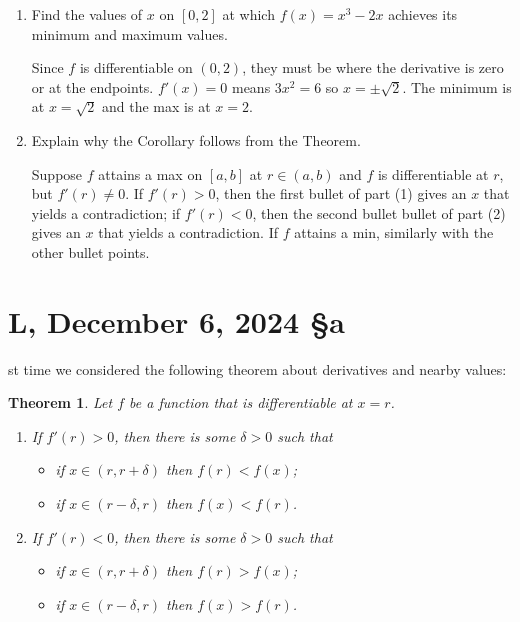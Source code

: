 \documentclass[12pt]{amsart}
\numberwithin{equation}{section}
\theoremstyle{plain} %
\newtheorem{thm}[equation]{Theorem}
\newcommand{\Dec}[3]{\section{#2, December #1, 2024 \quad \S#3}}
\theoremstyle{definition}
\theoremstyle{remark}
\begin{document}
 \begin{enumerate}
 
 \item Find the values of $x$ on $[0,2]$ at which $f(x) = x^3-2x$ achieves its minimum and maximum values.
 
\begin{framed}
Since $f$ is differentiable on $(0,2)$, they must be where the derivative is zero or at the endpoints. $f'(x)=0$ means $3x^2=6$ so $x=\pm \sqrt{2}$. The minimum is at $x=\sqrt{2}$ and the max is at $x=2$.
\end{framed}

 
 \item Explain why the Corollary follows from the Theorem.
 
 \begin{framed}
Suppose $f$ attains a max on $[a,b]$ at $r\in(a,b)$ and $f$ is differentiable at $r$, but $f'(r)\neq 0$. If $f'(r)>0$, then the first bullet of part (1) gives an $x$ that yields a contradiction; if $f'(r)<0$, then the second bullet bullet of part (2) gives an $x$ that yields a contradiction. If $f$ attains a min, similarly with the other bullet points.
\end{framed}

\end{enumerate}
 
 \Dec{6}
 
 Last time we considered the following theorem about derivatives and nearby values:
 
\begin{thm}\label{derivatives and nearby values} Let $f$ be a function that is differentiable at $x=r$.
 \begin{enumerate}
 \item 
 If $f'(r) > 0$, then there is some $\delta>0$ such that 
 \begin{itemize}
 \item if $x\in (r,r+\delta)$ then $f(r) < f(x)$;
  \item if $x\in (r-\delta,r)$ then $f(x) < f(r)$.
  \end{itemize}
  
  \item  If $f'(r) < 0$, then there is some $\delta>0$ such that 
  \begin{itemize}
 \item if $x\in (r,r+\delta)$ then $f(r) > f(x)$;
 \item if $x\in (r-\delta,r)$ then $f(x) > f(r)$.
  \end{itemize}
  \end{enumerate}
  \end{thm}
\end{document}
